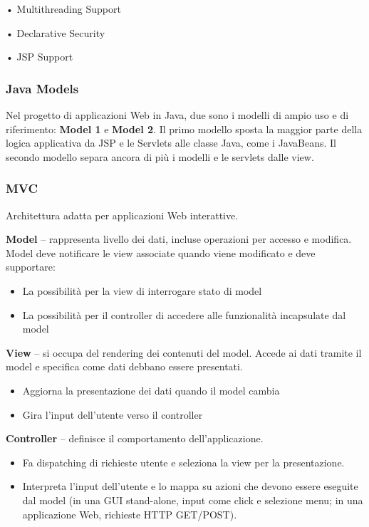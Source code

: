     • Multithreading Support
    
    • Declarative Security
    
    • JSP Support
    
    \subsubsection{Java Models}
    
    Nel progetto di applicazioni Web in Java, due sono i modelli di ampio uso e di riferimento: \textbf{Model 1} e \textbf{Model 2}. Il primo modello sposta la maggior parte della logica applicativa da JSP e le Servlets alle classe Java, come i JavaBeans. Il secondo modello separa ancora di più i modelli e le servlets dalle view.
    
    \subsubsection{MVC}
    
    Architettura adatta per applicazioni Web interattive.
    
    \vspace{3mm}
    
    \textbf{Model} – rappresenta livello dei dati, incluse operazioni per accesso e
    modifica. Model deve notificare le view associate quando viene modificato
    e deve supportare:
    
    \begin{itemize}
        \item La possibilità per la view di interrogare stato di model
        \item La possibilità per il controller di accedere alle funzionalità incapsulate dal model
    \end{itemize}

    \textbf{View} – si occupa del rendering dei contenuti del model. Accede ai dati
    tramite il model e specifica come dati debbano essere presentati.
    
    \begin{itemize}
        \item Aggiorna la presentazione dei dati quando il model cambia
        \item Gira l’input dell’utente verso il controller
    \end{itemize}
    
    \textbf{Controller} – definisce il comportamento dell’applicazione.
    
    \begin{itemize}
        \item Fa dispatching di richieste utente e seleziona la view per la presentazione.
        
        \item Interpreta l’input dell’utente e lo mappa su azioni che devono essere eseguite
        dal model (in una GUI stand-alone, input come click e selezione menu; in una
        applicazione Web, richieste HTTP GET/POST).
    \end{itemize}